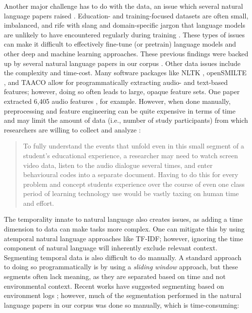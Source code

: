\documentclass[manuscript,screen,review]{acmart}
\begin{document}
Another major challenge has to do with the data, an issue which several natural language papers raised \cite{957160695,3783339081,3796180663}. Education- and training-focused datasets are often small, imbalanced, and rife with slang and domain-specific jargon that language models are unlikely to have encountered regularly during training \cite{cochran2022improving,cochran2023improving,cochran2023bimproving}. These types of issues can make it difficult to effectively fine-tune (or pretrain) language models \cite{cohn2020bert} and other deep and machine learning approaches. These previous findings were backed up by several natural language papers in our corpus \cite{957160695,3796643912,3448122334}. Other data issues include the complexity and time-cost. Many software packages like NLTK \cite{nltk}, openSMILTE \cite{eyben2010opensmile}, and TAACO \cite{crossley2016tool,crossley2019tool} allow for programmatically extracting audio- and text-based features; however, doing so often leads to large, opaque feature sets. One paper extracted 6,405 audio features \cite{3135645357}, for example. However, when done manually, preprocessing and feature engineering can be quite expensive in terms of time and may limit the amount of data (i.e., number of study participants) from which researchers are willing to collect and analyze \cite{32184286}: 

\begin{quote}
     To fully understand the events that unfold even in this small segment of a student's educational experience, a researcher may need to watch screen video data, listen to the audio dialogue several times, and enter behavioural codes into a separate document. Having to do this for every problem and concept students experience over the course of even one class period of learning technology use would be vastly taxing on human time and effort. \cite{3796180663}
\end{quote}

The temporality innate to natural language also creates issues, as adding a time dimension to data can make tasks more complex. One can mitigate this by using atemporal natural language approaches like TF-IDF; however, ignoring the time component of natural language will inherently exclude relevant context. Segmenting temporal data is also difficult to do manually. A standard approach to doing so programmatically is by using a \textit{sliding window} approach, but these segments often lack meaning, as they are separated based on time and not environmental context. Recent works have suggested segmenting based on environment logs \cite{snyder2023using,snyder2023analyzing}; however, much of the segmentation performed in the natural language papers in our corpus was done so manually, which is time-consuming:
\end{document}

